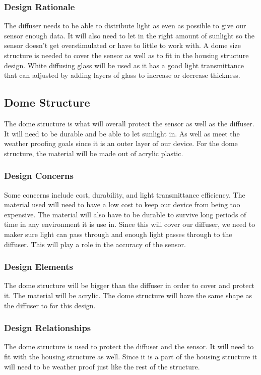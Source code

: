 \documentclass[10pt,draftclsnofoot,onecolumn,letterpaper]{article}
\begin{document}
\subsubsection{Design Rationale}
The diffuser needs to be able to distribute light as even as possible to give our sensor enough data. It will also need to let in the right amount of sunlight so the sensor doesn't get overstimulated or have to little to work with. A dome size structure is needed to cover the sensor as well as to fit in the housing structure design. White diffusing glass will be used as it has a good light transmittance that can adjusted by adding layers of glass to increase or decrease thickness.

\subsection{Dome Structure}
The dome structure is what will overall protect the sensor as well as the diffuser. It will need to be durable and be able to let sunlight in. As well as meet the weather proofing goals since it is an outer layer of our device. For the dome structure, the material will be made out of acrylic plastic. 
\subsubsection{Design Concerns}
Some concerns include cost, durability, and light transmittance efficiency. The material used will need to have a low cost to keep our device from being too expensive. The material will also have to be durable to survive long periods of time in any environment it is use in. Since this will cover our diffuser, we need to maker sure light can pass through and enough light passes through to the diffuser. This will play a role in the accuracy of the sensor.
\subsubsection{Design Elements}
The dome structure will be bigger than the diffuser in order to cover and protect it. The material will be acrylic. The dome structure will have the same shape as the diffuser to for this design. 
\subsubsection{Design Relationships}
The dome structure is used to protect the diffuser and the sensor. It will need to fit with the housing structure as well. Since it is a part of the housing structure it will need to be weather proof just like the rest of the structure.
\end{document}

